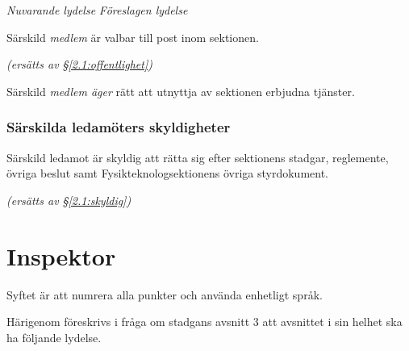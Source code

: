 \documentclass{article}
\newenvironment{lydelse}
    {\begin{paracol}{2}%
        \emph{Nuvarande lydelse}%
        \switchcolumn%
        \emph{Föreslagen lydelse}%
    \end{paracol}%
    \begin{enumerate}[label=\thesubsection.\arabic*]%
    \begin{paracol}{2}%
    }{\end{paracol}\end{enumerate}}
\newcommand{\itemb}{\item[\textbullet]}
\begin{document}
\begin{lydelse}
  \item Särskild \emph{medlem} är valbar till post inom sektionen.
  
  \emph{(ersätts av \S \ref{2.1:offentlighet})}

  \item Särskild \emph{medlem äger} rätt att utnyttja av sektionen erbjudna
   tjänster.

\switchcolumn*
    \subsubsection*{Särskilda ledamöters skyldigheter}%
    \itemb Särskild ledamot är skyldig att rätta sig efter sektionens stadgar,
  regle\-mente, övriga beslut samt  Fysikteknologsektionens övriga styrdokument.
    
\switchcolumn
    \emph{(ersätts av \S \ref{2.1:skyldig})}
\end{lydelse}

\section{Inspektor}
Syftet är att numrera alla punkter och använda enhetligt språk.

Härigenom föreskrivs i fråga om stadgans avsnitt 3 att avsnittet i sin helhet ska ha följande lydelse.
\end{document}
